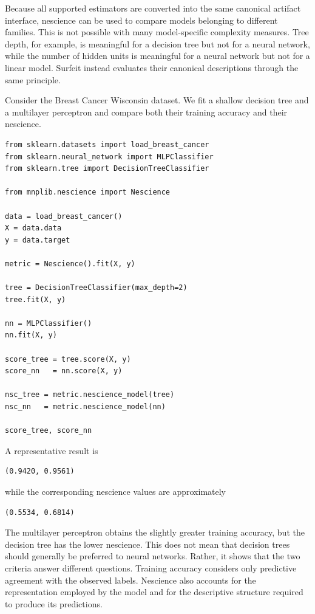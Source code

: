 Because all supported estimators are converted into the same canonical artifact interface, nescience can be used to compare models belonging to different families. This is not possible with many model-specific complexity measures. Tree depth, for example, is meaningful for a decision tree but not for a neural network, while the number of hidden units is meaningful for a neural network but not for a linear model. Surfeit instead evaluates their canonical descriptions through the same principle.

\begin{example}
\label{ex:nescience_comparison}

Consider the Breast Cancer Wisconsin dataset. We fit a shallow decision tree and a multilayer perceptron and compare both their training accuracy and their nescience.

\begin{sourcecode}
{\scriptsize
\begin{verbatim}
from sklearn.datasets import load_breast_cancer
from sklearn.neural_network import MLPClassifier
from sklearn.tree import DecisionTreeClassifier

from mnplib.nescience import Nescience

data = load_breast_cancer()
X = data.data
y = data.target

metric = Nescience().fit(X, y)

tree = DecisionTreeClassifier(max_depth=2)
tree.fit(X, y)

nn = MLPClassifier()
nn.fit(X, y)

score_tree = tree.score(X, y)
score_nn   = nn.score(X, y)

nsc_tree = metric.nescience_model(tree)
nsc_nn   = metric.nescience_model(nn)

score_tree, score_nn
\end{verbatim}}
\end{sourcecode}

A representative result is

\begin{verbatim}
(0.9420, 0.9561)
\end{verbatim}

while the corresponding nescience values are approximately

\begin{verbatim}
(0.5534, 0.6814)
\end{verbatim}

The multilayer perceptron obtains the slightly greater training accuracy, but the decision tree has the lower nescience. This does not mean that decision trees should generally be preferred to neural networks. Rather, it shows that the two criteria answer different questions. Training accuracy considers only predictive agreement with the observed labels. Nescience also accounts for the representation employed by the model and for the descriptive structure required to produce its predictions.
\end{example}

